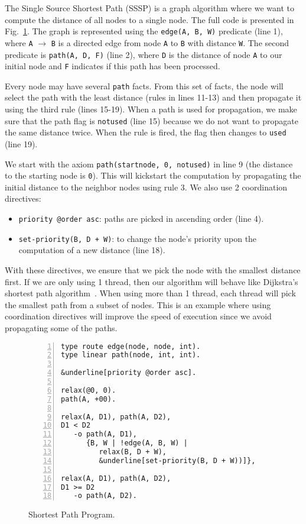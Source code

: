 The Single Source Shortest Path (SSSP) is a graph algorithm where we want to compute the
distance of all nodes to a single node. The full code is presented in Fig.~\ref{code:shortest_path_program}.
The graph is represented using the \texttt{edge(A,~B,~W)} predicate (line 1), where
\texttt{A} $\rightarrow$ \texttt{B} is a directed edge from node \texttt{A} to \texttt{B}
with distance \texttt{W}. The second predicate is \texttt{path(A,~D,~F)} (line 2), where
\texttt{D} is the distance of node \texttt{A} to our initial node and \texttt{F}
indicates if this path has been processed.

Every node may have several \texttt{path} facts. From this set of facts, the node will select
the path with the least distance (rules in lines 11-13) and then propagate it using the third rule (lines 15-19).
When a path is used for propagation, we make sure that the path flag is \texttt{notused} (line 15)
because we do not want to propagate the same distance twice. When the rule is fired, the flag
then changes to \texttt{used} (line 19).

We start with the axiom \texttt{path(startnode,~0,~notused)} in line 9 (the distance to the starting
node is \texttt{0}). This will kickstart the computation by propagating the initial distance to the
neighbor nodes using rule 3. We also use 2 coordination directives:

\begin{itemize}
   \item \texttt{priority~@order~asc}: paths are picked in ascending order (line 4).
   \item \texttt{set-priority(B,~D~+~W)}: to change the node's priority upon the computation of
a new distance (line 18).
\end{itemize}

With these directives, we ensure that we pick the node with the smallest distance
first. If we are only using 1 thread, then our algorithm will behave like Dijkstra's shortest
path algorithm~\cite{Dijkstra}. When using more than 1 thread, each thread will pick the smallest
path from a subset of nodes. This is an example where using coordination directives will
improve the speed of execution since we avoid propagating some of the paths.

\begin{figure}[h!]
\small\begin{Verbatim}[numbers=left,commandchars=&\[\]]
type route edge(node, node, int).
type linear path(node, int, int).

&underline[priority @order asc].

relax(@0, 0).
path(A, +00).

relax(A, D1), path(A, D2),
D1 < D2
   -o path(A, D1),
      {B, W | !edge(A, B, W) |
         relax(B, D + W),
         &underline[set-priority(B, D + W))]},

relax(A, D1), path(A, D2),
D1 >= D2
   -o path(A, D2).
\end{Verbatim}
  \caption{Shortest Path Program.}
  \label{code:shortest_path_program}
\end{figure}
\normalsize

